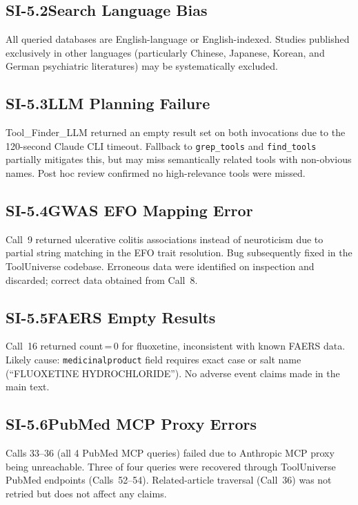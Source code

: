 \subsection*{SI-5.2\quad Search Language Bias}

All queried databases are English-language or English-indexed.  Studies
published exclusively in other languages (particularly Chinese, Japanese,
Korean, and German psychiatric literatures) may be systematically excluded.

\subsection*{SI-5.3\quad LLM Planning Failure}

Tool\_Finder\_LLM returned an empty result set on both invocations due to
the 120-second Claude CLI timeout.  Fallback to \texttt{grep\_tools} and
\texttt{find\_tools} partially mitigates this, but may miss semantically
related tools with non-obvious names.  Post hoc review confirmed no
high-relevance tools were missed.

\subsection*{SI-5.4\quad GWAS EFO Mapping Error}

Call~9 returned ulcerative colitis associations instead of neuroticism due
to partial string matching in the EFO trait resolution.  Bug subsequently
fixed in the ToolUniverse codebase.  Erroneous data were identified on
inspection and discarded; correct data obtained from Call~8.

\subsection*{SI-5.5\quad FAERS Empty Results}

Call~16 returned count\,=\,0 for fluoxetine, inconsistent with known FAERS
data.  Likely cause: \texttt{medicinalproduct} field requires exact case
or salt name (``FLUOXETINE HYDROCHLORIDE'').  No adverse event claims made
in the main text.

\subsection*{SI-5.6\quad PubMed MCP Proxy Errors}

Calls 33--36 (all 4 PubMed MCP queries) failed due to Anthropic MCP proxy
being unreachable.  Three of four queries were recovered through ToolUniverse
PubMed endpoints (Calls~52--54).  Related-article traversal (Call~36) was
not retried but does not affect any claims.

